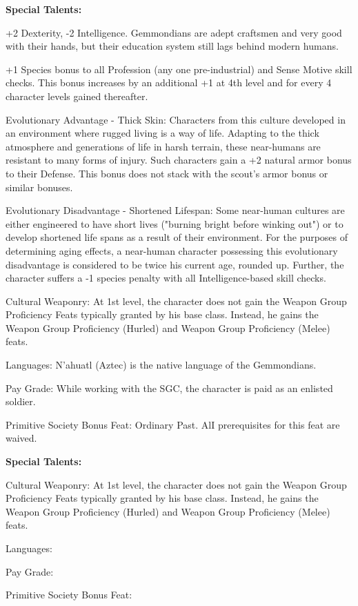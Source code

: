 \textbf{Special Talents:}
\begin{itemize*}
\item +2 Dexterity, -2 Intelligence. Gemmondians are adept craftsmen and very good with their hands, but their education system still lags behind modern humans.
\item +1 Species bonus to all Profession (any one pre-industrial) and Sense Motive skill checks. This bonus increases by an additional +1 at 4th level and for every 4 character levels gained thereafter.
\item Evolutionary Advantage - Thick Skin: Characters from this culture developed in
an environment where rugged living is a way of life. Adapting to the thick atmosphere and generations of life in harsh terrain, these near-humans are resistant to many forms of injury. Such characters gain a +2 natural armor bonus to their Defense. This bonus does not stack with the scout's armor bonus or similar bonuses.
\item Evolutionary Disadvantage - Shortened Lifespan: Some near-human cultures are either engineered to have short lives ("burning bright before winking out") or to develop shortened life spans as a result of their environment. For the purposes of determining aging effects, a near-human character possessing this evolutionary disadvantage is considered to be twice his current age, rounded up. Further, the character suffers a -1 species penalty with all Intelligence-based skill checks.
\item Cultural Weaponry: At 1st level, the character does not gain the Weapon Group Proficiency Feats typically granted by his base class. Instead, he gains the Weapon Group Proficiency (Hurled) and Weapon Group Proficiency (Melee) feats.
\item Languages: N'ahuatl (Aztec) is the native language of the Gemmondians.
\item Pay Grade: While working with the SGC, the character is paid as an enlisted soldier.
\item Primitive Society Bonus Feat: Ordinary Past. AlI prerequisites for this feat are waived.
\end{itemize*}



\textbf{Special Talents:}
\begin{itemize*}
\item 
\item 
\item 
\item 
\item Cultural Weaponry: At 1st level, the character does not gain the Weapon Group Proficiency Feats typically granted by his base class. Instead, he gains the Weapon Group Proficiency (Hurled) and Weapon Group Proficiency (Melee) feats.
\item Languages:
\item Pay Grade: 
\item Primitive Society Bonus Feat: 
\end{itemize*}

